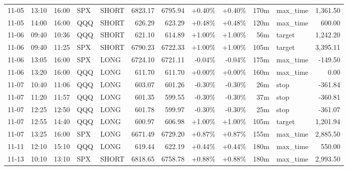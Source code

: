 \documentclass[11pt,a4paper,twoside]{article}
\begin{document}
\begin{center}
\begin{longtable}{>{\color{txtmain}}l l l l l r r r r r >{\color{txtmain}}l r}
11-05 & 13:10 & 16:00 & SPX & SHORT & 6823.17 & 6795.94 & \textcolor{wingreen}{+0.40\%} & \textcolor{wingreen}{+0.40\%} & 170m & max\_time & \textcolor{wingreen}{1,361.50} \\
11-05 & 14:00 & 16:00 & QQQ & SHORT & 626.29 & 623.29 & \textcolor{wingreen}{+0.48\%} & \textcolor{wingreen}{+0.48\%} & 120m & max\_time & \textcolor{wingreen}{600.00} \\
11-06 & 09:40 & 10:36 & QQQ & SHORT & 621.10 & 614.89 & \textcolor{wingreen}{+1.00\%} & \textcolor{wingreen}{+1.00\%} & 56m & target & \textcolor{wingreen}{1,242.20} \\
11-06 & 09:40 & 11:25 & SPX & SHORT & 6790.23 & 6722.33 & \textcolor{wingreen}{+1.00\%} & \textcolor{wingreen}{+1.00\%} & 105m & target & \textcolor{wingreen}{3,395.11} \\
11-06 & 13:05 & 16:00 & SPX & LONG & 6724.10 & 6721.11 & \textcolor{lossred}{-0.04\%} & \textcolor{lossred}{-0.04\%} & 175m & max\_time & \textcolor{lossred}{-149.50} \\
11-06 & 13:20 & 16:00 & QQQ & LONG & 611.70 & 611.70 & \textcolor{wingreen}{+0.00\%} & \textcolor{wingreen}{+0.00\%} & 160m & max\_time & \textcolor{wingreen}{0.00} \\
11-07 & 10:40 & 11:06 & QQQ & LONG & 603.07 & 601.26 & \textcolor{lossred}{-0.30\%} & \textcolor{lossred}{-0.30\%} & 26m & stop & \textcolor{lossred}{-361.84} \\
11-07 & 11:20 & 11:57 & QQQ & LONG & 601.35 & 599.55 & \textcolor{lossred}{-0.30\%} & \textcolor{lossred}{-0.30\%} & 37m & stop & \textcolor{lossred}{-360.81} \\
11-07 & 12:25 & 12:50 & QQQ & LONG & 601.78 & 599.97 & \textcolor{lossred}{-0.30\%} & \textcolor{lossred}{-0.30\%} & 25m & stop & \textcolor{lossred}{-361.07} \\
11-07 & 12:55 & 14:40 & QQQ & LONG & 600.97 & 606.98 & \textcolor{wingreen}{+1.00\%} & \textcolor{wingreen}{+1.00\%} & 105m & target & \textcolor{wingreen}{1,201.94} \\
11-07 & 13:25 & 16:00 & SPX & LONG & 6671.49 & 6729.20 & \textcolor{wingreen}{+0.87\%} & \textcolor{wingreen}{+0.87\%} & 155m & max\_time & \textcolor{wingreen}{2,885.50} \\
11-11 & 12:10 & 15:10 & QQQ & LONG & 619.44 & 622.19 & \textcolor{wingreen}{+0.44\%} & \textcolor{wingreen}{+0.44\%} & 180m & max\_time & \textcolor{wingreen}{550.00} \\
11-13 & 10:10 & 13:10 & SPX & SHORT & 6818.65 & 6758.78 & \textcolor{wingreen}{+0.88\%} & \textcolor{wingreen}{+0.88\%} & 180m & max\_time & \textcolor{wingreen}{2,993.50} \\

\end{longtable}
\end{center}
\end{document}
